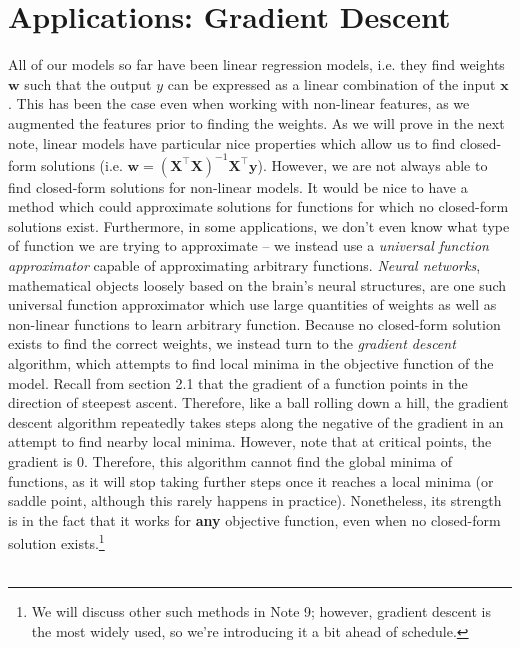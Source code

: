 \documentclass{article}
\begin{document}
\clearpage

\section*{Applications: Gradient Descent}
All of our models so far have been linear regression models, i.e. they find weights $\mathbf{w}$ such that the output $y$ can be expressed as a linear combination of the input $\mathbf{x}$. This has been the case even when working with non-linear features, as we augmented the features prior to finding the weights. As we will prove in the next note, linear models have particular nice properties which allow us to find closed-form solutions (i.e. $\mathbf{w} = (\mathbf{X^{\top}X})^{-1}\mathbf{X^{\top}y}$). However, we are not always able to find closed-form solutions for non-linear models. It would be nice to have a method which could approximate solutions for functions for which no closed-form solutions exist. Furthermore, in some applications, we don't even know what type of function we are trying to approximate -- we instead use a \textit{universal function approximator} capable of approximating arbitrary functions. \textit{Neural networks}, mathematical objects loosely based on the brain's neural structures, are one such universal function approximator which use large quantities of weights as well as non-linear functions to learn arbitrary function. Because no closed-form solution exists to find the correct weights, we instead turn to the \textit{gradient descent} algorithm, which attempts to find local minima in the objective function of the model. Recall from section 2.1 that the gradient of a function points in the direction of steepest ascent. Therefore, like a ball rolling down a hill, the gradient descent algorithm repeatedly takes steps along the negative of the gradient in an attempt to find nearby local minima. However, note that at critical points, the gradient is 0. Therefore, this algorithm cannot find the global minima of functions, as it will stop taking further steps once it reaches a local minima (or saddle point, although this rarely happens in practice). Nonetheless, its strength is in the fact that it works for \textbf{any} objective function, even when no closed-form solution exists.\footnote{We will discuss other such methods in Note 9; however, gradient descent is the most widely used, so we're introducing it a bit ahead of schedule.}\\\\
\end{document}
